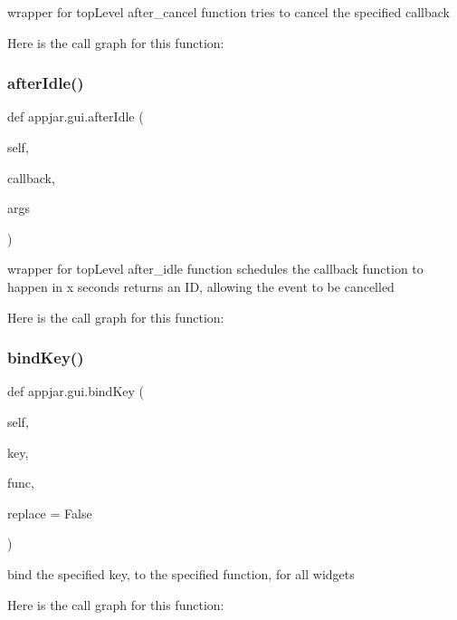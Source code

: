 \begin{DoxyVerb}wrapper for topLevel after_cancel function
    tries to cancel the specified callback \end{DoxyVerb}
 Here is the call graph for this function\+:
\mbox{\label{classappjar_1_1gui_a2591b3c63bf3e015db40f14ef62c8b1a}} 
\subsubsection{\texorpdfstring{after\+Idle()}{afterIdle()}}
{\footnotesize\ttfamily def appjar.\+gui.\+after\+Idle (\begin{DoxyParamCaption}\item[{}]{self,  }\item[{}]{callback,  }\item[{}]{args }\end{DoxyParamCaption})}

\begin{DoxyVerb}wrapper for topLevel after_idle function
    schedules the callback function to happen in x seconds
    returns an ID, allowing the event to be cancelled \end{DoxyVerb}
 Here is the call graph for this function\+:
\mbox{\label{classappjar_1_1gui_ae9748f0e34a0fc456803323db85d4b55}} 
\subsubsection{\texorpdfstring{bind\+Key()}{bindKey()}}
{\footnotesize\ttfamily def appjar.\+gui.\+bind\+Key (\begin{DoxyParamCaption}\item[{}]{self,  }\item[{}]{key,  }\item[{}]{func,  }\item[{}]{replace = {\ttfamily False} }\end{DoxyParamCaption})}

\begin{DoxyVerb}bind the specified key, to the specified function, for all widgets \end{DoxyVerb}
 Here is the call graph for this function\+:
\mbox{\label{classappjar_1_1gui_a5e0af1dca75612aa8e928aaea3448f8b}} 
